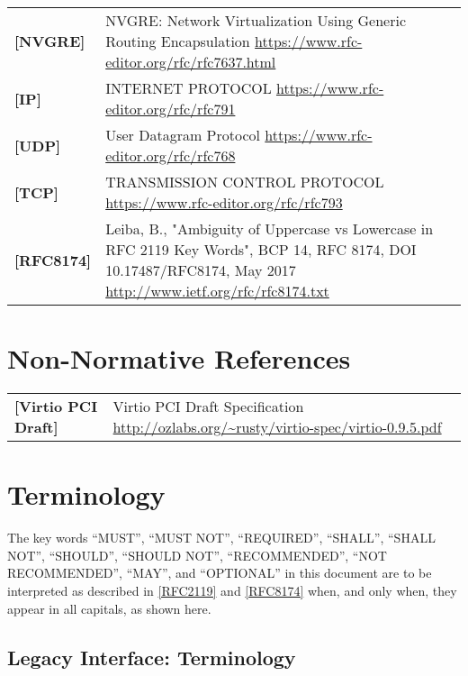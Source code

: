 \begin{longtable}{l p{5in}}
	\label{intro:nvgre}\textbf{[NVGRE]} &
    NVGRE: Network Virtualization Using Generic Routing Encapsulation
	\newline\url{https://www.rfc-editor.org/rfc/rfc7637.html}\\
	\label{intro:IP}\textbf{[IP]} &
    INTERNET PROTOCOL
	\newline\url{https://www.rfc-editor.org/rfc/rfc791}\\
	\label{intro:UDP}\textbf{[UDP]} &
    User Datagram Protocol
	\newline\url{https://www.rfc-editor.org/rfc/rfc768}\\
	\label{intro:TCP}\textbf{[TCP]} &
    TRANSMISSION CONTROL PROTOCOL
	\newline\url{https://www.rfc-editor.org/rfc/rfc793}\\
	\label{intro:rfc8174}\textbf{[RFC8174]} &
    Leiba, B., "Ambiguity of Uppercase vs Lowercase in RFC 2119 Key Words", BCP
    14, RFC 8174, DOI 10.17487/RFC8174, May 2017
        \newline\url{http://www.ietf.org/rfc/rfc8174.txt}\\
\end{longtable}

\section{Non-Normative References}

\begin{longtable}{l p{5in}}
	\label{intro:Virtio PCI Draft}\textbf{[Virtio PCI Draft]} &
	Virtio PCI Draft Specification
	\newline\url{http://ozlabs.org/~rusty/virtio-spec/virtio-0.9.5.pdf}\\
\end{longtable}

\section{Terminology}\label{Terminology}

The key words ``MUST'', ``MUST NOT'', ``REQUIRED'', ``SHALL'', ``SHALL NOT'',
``SHOULD'', ``SHOULD NOT'', ``RECOMMENDED'', ``NOT RECOMMENDED'', ``MAY'', and
``OPTIONAL'' in this document are to be interpreted as described in
\hyperref[intro:rfc2119]{[RFC2119]} and \hyperref[intro:rfc8174]{[RFC8174]} when,
and only when, they appear in all capitals, as shown here.
\subsection{Legacy Interface: Terminology}\label{intro:Legacy
Interface: Terminology}


